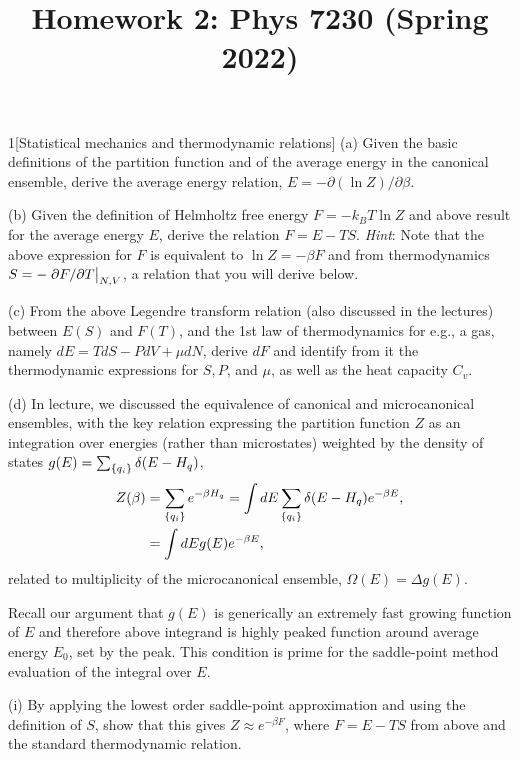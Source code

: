 \documentclass[12pt]{article}
\title{Homework 2: Phys 7230 (Spring 2022)}
\begin{document}
\maketitle
\begin{problem}{1}[Statistical mechanics and thermodynamic relations]
(a) Given the basic definitions of the partition function and of the average
energy in the canonical ensemble, derive the average energy relation,
$E=-\partial(\ln Z)/\partial\beta$.

(b) Given the definition of Helmholtz free energy $F=-k_BT\ln Z$ and above
result for the average energy $E$, derive the relation $F=E-TS$. \textit{Hint}:
Note that the above expression for $F$ is equivalent to $\ln Z=-\beta F$ and
from thermodynamics $S=-\eval{\partial F/\partial T}_{N,V}$, a relation that you
will derive below.

(c) From the above Legendre transform relation (also discussed in the lectures)
between $E(S)$ and $F(T)$, and the 1st law of thermodynamics for e.g., a gas,
namely $dE=TdS-PdV+\mu dN$, derive $dF$ and identify from it the thermodynamic
expressions for $S, P$, and $\mu$, as well as the heat capacity $C_v$.

(d) In lecture, we discussed the equivalence of canonical and microcanonical
ensembles, with the key relation expressing the partition function $Z$ as an
integration over energies (rather than microstates) weighted by the density of
states $g(E)=\sum_\qty{q_i}\delta(E-H_q)$,
\begin{align}
    Z(\beta)&=\sum_\qty{q_i}e^{-\beta H_q}=\int
    dE\sum_\qty{q_i}\delta(E-H_q)e^{-\beta E},\notag\\
    &=\int dEg(E)e^{-\beta E},
\end{align}
related to multiplicity of the microcanonical ensemble, $\Omega(E)=\Delta g(E)$.

Recall our argument that $g(E)$ is generically an extremely fast growing
function of $E$ and therefore above integrand is highly peaked function around
average energy $E_0$, set by the peak. This condition is prime for the
saddle-point method evaluation of the integral over $E$.

\qquad(i) By applying the lowest order saddle-point approximation and using the
definition of $S$, show that this gives $Z\approx e^{-\beta F}$, where $F=E-TS$
from above and the standard thermodynamic relation.


\end{problem}
\end{document}
